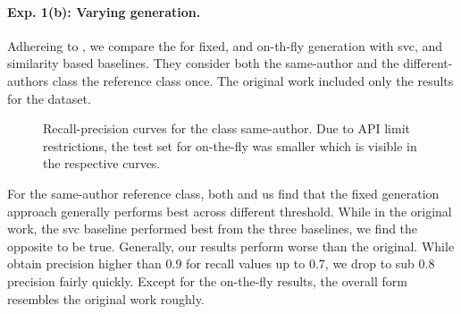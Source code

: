 \paragraph{Exp. 1(b): Varying \imp{} generation.}

Adhereing to \citet{koppel_determining_2014}, we compare the \impAppr{} for fixed, and on-th-fly \imp{} generation with \ac{svc}, and similarity based baselines.
They consider both the same-author and the different-authors class the reference class once.
The original work included only the results for the \dataBlog{} dataset.

\begin{figure}[htbp]
  \centering
  \begin{subfigure}[b]{0.495\textwidth}
    \centering
    
    \caption{\dataBlog{}}
    \label{fig:blog_same_author}
  \end{subfigure}
  \hfill
  \begin{subfigure}[b]{0.495\textwidth}
    \centering
    
    \caption{\dataStudent{}}
    \label{fig:student_essays_same_author}
  \end{subfigure}
  \caption{Recall-precision curves for the class same-author. Due to API limit restrictions, the test set for on-the-fly was smaller which is visible in the respective curves.}
  \label{fig:same_authors}
\end{figure}

For the same-author reference class, both \citet{koppel_determining_2014} and us find that the fixed \imp{} generation approach generally performs best across different threshold.
While in the original work, the \ac{svc} baseline performed best from the three baselines, we find the opposite to be true.
Generally, our results perform worse than the original. 
While \citet{koppel_determining_2014} obtain precision higher than $0.9$ for recall values up to $0.7$, we drop to sub $0.8$ precision fairly quickly.
Except for the on-the-fly results, the overall form resembles the original work roughly.


